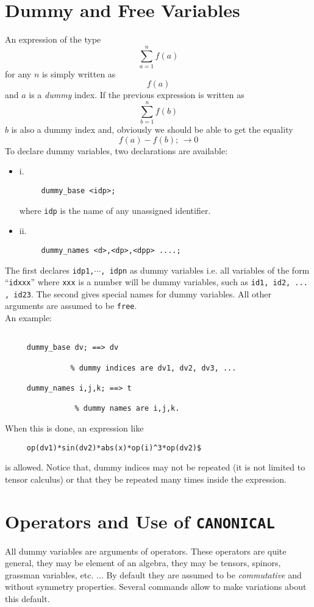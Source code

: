 \section{Dummy and Free Variables}
An expression of the type
$$
\sum_{a=1}^{n} f(a)
$$
for any $n$ is  simply written as
$$
f(a)
$$
and $a$ is a {\em dummy} index.
If the previous expression is written as
$$
\sum_{b=1}^{n} f(b)
$$
$b$ is also a dummy index and, obviously we should be able to get the
equality
$$
f(a)-f(b);\, \rightarrow  0
$$
To declare dummy variables, two declarations are available:
\begin{itemize}
\item{i.}
\begin{verbatim}
     dummy_base <idp>;
\end{verbatim}
where {\tt idp} is the name of any unassigned identifier.
\item{ii.}
\begin{verbatim}
     dummy_names <d>,<dp>,<dpp> ....;
\end{verbatim}
\end{itemize}
The first declares {\tt idp1,$\cdots$, idpn} as dummy variables i.e.
all variables of the form ``{\tt idxxx}'' where {\tt xxx} is a number
will be dummy variables, such as {\tt id1, id2, ... , id23}.
The second gives special names for dummy variables.
All other arguments are assumed to be {\tt free}.\\
An example:
\begin{verbatim}

     dummy_base dv; ==> dv

               % dummy indices are dv1, dv2, dv3, ...

     dummy_names i,j,k; ==> t

                % dummy names are i,j,k.

\end{verbatim}
When this is done, an expression like
\begin{verbatim}
     op(dv1)*sin(dv2)*abs(x)*op(i)^3*op(dv2)$
\end{verbatim}
is allowed. Notice that, dummy indices may not be repeated (it is not
limited to tensor calculus) or that they be repeated many times inside
the expression.
\section{Operators and Use of {\tt CANONICAL}}
All dummy variables are arguments of operators. These operators are
quite general, they may be element of an algebra, they may be tensors,
spinors, grassman variables, etc. $\ldots$
By default they are assumed to be {\em commutative} and without symmetry
properties. Several commands allow to make variations about this default.

